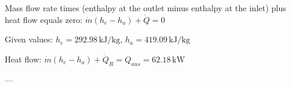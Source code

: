 Mass flow rate times (enthalpy at the outlet minus enthalpy at the inlet) plus heat flow equals zero:  
\( \dot{m} (h_e - h_a) + \dot{Q} = 0 \)  

Given values:  
\( h_e = 292.98 \, \text{kJ/kg} \), \( h_a = 419.09 \, \text{kJ/kg} \)  

Heat flow:  
\( \dot{m} (h_e - h_a) + \dot{Q}_R = Q_{aus} = 62.18 \, \text{kW} \)  

---